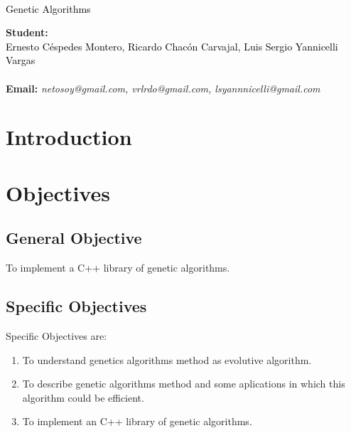 \documentclass[letterpaper]{article}
\newcommand{\uic}{black} %
\newcommand{\uim}{\\} %
\newcommand{\userinput}[1]{\textcolor{\uic}{\uim#1\uim}}
\begin{document}
\vspace*{2cm}

\begin{center}
\Huge
\userinput{Genetic Algorithms}
\vspace*{1cm}
\end{center}

\noindent
\small\baselineskip=14pt
\textbf{Student:} \userinput{Ernesto Céspedes Montero, Ricardo Chacón Carvajal, Luis Sergio Yannicelli Vargas}\\
\textbf{Email:} \textit{netosoy@gmail.com, vrlrdo@gmail.com, lsyannnicelli@gmail.com}\\


\section{Introduction}

\section{Objectives}

\subsection{General Objective}

To implement a C++ library of genetic algorithms.

\subsection{Specific Objectives}

Specific Objectives are:\\

\begin{enumerate}
\item To understand genetics algorithms method as evolutive algorithm.
\item To describe genetic algorithms method and some aplications in which this algorithm could be efficient.
\item To implement an C++ library of genetic algorithms.
\end{enumerate}
\end{document}
